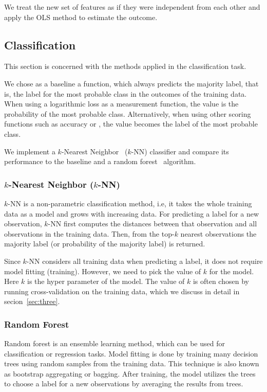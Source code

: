 We treat the new set of features as if they were independent from each other
and apply the OLS method to estimate the outcome.

\subsection{Classification}

This section is concerned with the methods applied in the classification task.

We chose as a baseline a function, which always predicts the majority label,
that is, the label for the most probable class in the outcomes of the training
data.  When using a logarithmic loss as a measurement function, the value is the
probability of the most probable class.  Alternatively, when using other scoring
functions such as accuracy or \fmeasure, the value becomes the label of the most
probable class.

We implement a $k$-Nearest Neighbor~\cite{cover:1967} ($k$-NN) classifier and
compare its performance to the baseline and a random forest~\cite{breiman:2001}
algorithm.

\subsubsection{$k$-Nearest Neighbor ($k$-NN)}

$k$-NN is a non-parametric classification method, i.e, it takes the whole
training data as a model and grows with increasing data.  For predicting a label
for a new observation, $k$-NN first computes the distances between that
observation and all observations in the training data.  Then, from the top-$k$
nearest observations the majority label (or probability of the majority label)
is returned.

Since $k$-NN considers all training data when predicting a label, it does not
require model fitting (training).  However, we need to pick the value of $k$ for
the model.  Here $k$ is the hyper parameter of the model.  The value of $k$ is
often chosen by running cross-validation on the training data, which we discuss
in detail in secion~\ref{sec:three}.

\subsubsection{Random Forest}

Random forest is an ensemble learning method, which can be used for
classification or regression tasks.  Model fitting is done by training many
decision trees using random samples from the training data.  This technique is
also known as bootstrap aggregating or bagging.  After training, the model
utilizes the trees to choose a label for a new observations by averaging the
results from trees.

